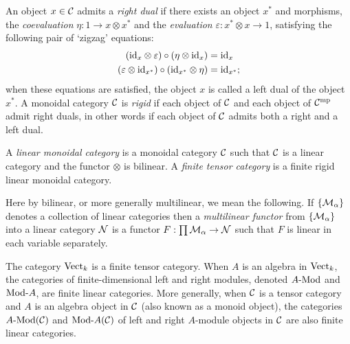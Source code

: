 \documentclass{amsart}
\begin{document}
\begin{definition} \label{def:rigid}
	An object $x \in \mathcal C$ admits a {\em right dual} if there exists an object $x^*$ and morphisms, the {\em coevaluation} $\eta: 1 \to x \otimes x^*$ and the {\em evaluation} $\varepsilon: x^* \otimes x \to 1$, satisfying the following pair of `zigzag' equations:
	\begin{align*}
		(\mathrm{id}_{x} \otimes \varepsilon  ) \circ (  \eta \otimes \mathrm{id}_{x}) &= \mathrm{id}_{x} \\
		(\varepsilon \otimes \mathrm{id}_{x^*}) \circ (\mathrm{id}_{x^*} \otimes \eta) &= \mathrm{id}_{x^*};
	\end{align*}
	when these equations are satisfied, the object $x$ is called a left dual of the object $x^*$.  A monoidal category $\mathcal C$ is {\em rigid} if each object of $\mathcal C$ and each object of $\mathcal C^{\mathrm{mp}}$ admit right duals, in other words if each object of $\mathcal C$ admits both a right and a left dual. 
\end{definition}



\begin{definition}
	A {\em linear monoidal category} is a monoidal category $\mathcal C$ such that $\mathcal C$ is a linear category and the functor $\otimes$ is bilinear. A {\em finite tensor category} is a finite rigid linear monoidal category.   
\end{definition}

\nid Here by bilinear, or more generally multilinear, we mean the following.  If $\{\mathcal M_\alpha\}$ denotes a collection of linear categories then a {\em multilinear functor} from $\{\mathcal M_\alpha\}$ into a linear category $\mathcal N$ is a functor $F: \prod \mathcal M_\alpha \to \mathcal N$ such that $F$ is linear in each variable separately. 



\begin{example}
	The category $\mathrm{Vect}_k$ is a finite tensor category. When $A$ is an algebra in $\mathrm{Vect}_k$, the categories of finite-dimensional left and right modules, denoted $\Mod{A}{}$ and $\Mod{}{A}$, are finite linear categories. More generally, when $\mathcal C$ is a tensor category and $A$ is an algebra object in $\mathcal C$ (also known as a monoid object), the categories $\Mod{A}{}(\cC)$ and $\Mod{}{A}(\cC)$ of left and right $A$-module objects in $\mathcal C$ are also finite linear categories.
\end{example}
\end{document}
